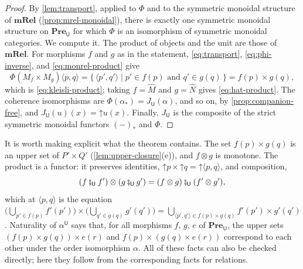 \documentclass[11pt,a4paper]{article}
\theoremstyle{plain}
\theoremstyle{definition}
\theoremstyle{remark}
\newcommand{\Cat}[1]{\mathbf{#1}}
\newcommand{\Pre}{\Cat{Pre}}
\newcommand{\mRel}{\Cat{mRel}}
\newcommand{\U}{\mathsf{U}}
\newcommand{\PreU}{\Pre_{\U}}
\newcommand{\thenU}{\mathbin{\fatsemi_{\U}}}
\newcommand{\tup}[1]{\langle #1 \rangle}
\newcommand{\up}{\mathord{\uparrow}}
\newcommand{\comp}[1]{#1_{*}}
\begin{document}
\begin{proof}
    By \cref{lem:transport}, applied to $\Phi$ and to the symmetric monoidal structure of $\mRel$ (\cref{prop:mrel-monoidal}), there is exactly one symmetric monoidal structure on $\PreU$ for which $\Phi$ is an isomorphism of symmetric monoidal categories.
    We compute it.
    The product of objects and the unit are those of $\mRel$.
    For morphisms $f$ and $g$ as in the statement, \cref{eq:transport}, \cref{eq:phi-inverse}, and \cref{eq:monrel-product} give
    \begin{equation*}
        \Phi(M_f \times M_g)\tup{p,q}
        = \{\, \tup{p',q'} \mid p' \in f(p) \text{ and } q' \in g(q) \,\}
        = f(p) \times g(q),
    \end{equation*}
    which is \cref{eq:kleisli-product}; taking $f = \widehat{M}$ and $g = \widehat{N}$ gives \cref{eq:hat-product}.
    The coherence isomorphisms are $\Phi(\comp{\alpha}) = J_{\U}(\alpha)$, and so on, by \cref{prop:companion-free}, and $J_{\U}(u)(x) = \up u(x)$.
    Finally, $J_{\U}$ is the composite of the strict symmetric monoidal functors $\comp{(-)}$ and $\Phi$.
\end{proof}

It is worth making explicit what the theorem contains.
The set $f(p) \times g(q)$ is an upper set of $P' \times Q'$ (\cref{lem:upper-closure}(e)), and $f \otimes g$ is monotone.
The product is a functor: it preserves identities, $\up p \times \up q = \up \tup{p,q}$, and composition,
\begin{equation}
    \label{eq:kleisli-interchange}
    (f \thenU f') \otimes (g \thenU g') = (f \otimes g) \thenU (f' \otimes g'),
\end{equation}
which at $\tup{p,q}$ is the equation $\bigl(\bigcup_{p' \in f(p)} f'(p')\bigr) \times \bigl(\bigcup_{q' \in g(q)} g'(q')\bigr) = \bigcup_{\tup{p',q'} \in f(p) \times g(q)} f'(p') \times g'(q')$.
Naturality of $\alpha^{\U}$ says that, for all morphisms $f$, $g$, $e$ of $\PreU$, the upper sets $(f(p) \times g(q)) \times e(r)$ and $f(p) \times (g(q) \times e(r))$ correspond to each other under the order isomorphism $\alpha$.
All of these facts can also be checked directly; here they follow from the corresponding facts for relations.
\end{document}
